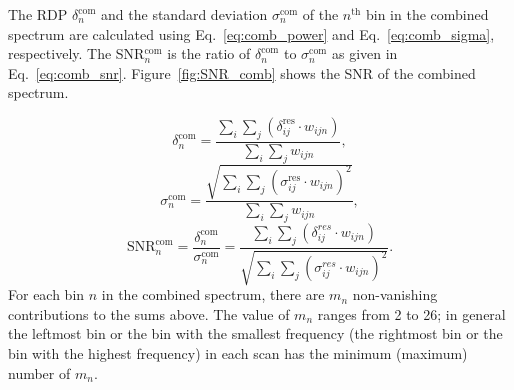 The RDP $\delta^\text{com}_{n}$ and the standard deviation 
$\sigma^\text{com}_{n}$ of the $n^\text{th}$ bin in the combined spectrum are 
calculated using Eq.~\eqref{eq:comb_power} and Eq.~\eqref{eq:comb_sigma}, 
respectively. The SNR$^\text{com}_{n}$ is the ratio of 
$\delta^\text{com}_{n}$ to 
$\sigma^\text{com}_{n}$ as given in Eq.~\eqref{eq:comb_snr}. 
Figure~\ref{fig:SNR_comb} shows the SNR of the combined spectrum. 

\begin{equation}
    \label{eq:comb_power}
    \delta_{n}^\text{com} = \frac{ \sum\limits_{i}\sum\limits_{j}\left(\delta_{ij}^\text{res} \cdot {w_{ijn}}\right)}{\sum\limits_{i}\sum\limits_{j} {w_{ijn}}},
\end{equation}
\begin{equation}
    \label{eq:comb_sigma}
    \sigma_{n}^\text{com} = \frac{ \sqrt{\sum\limits_{i}\sum\limits_{j}(\sigma_{ij}^\text{res} \cdot {w_{ijn}})^2}}{\sum\limits_{i}\sum\limits_{j} {w_{ijn}}},
\end{equation}
\begin{equation}
    \label{eq:comb_snr}
    \text{SNR}_{n}^\text{com} = \frac{\delta^\text{com}_{n}}{\sigma^\text{com}_{n}}= \frac{\sum\limits_{i}\sum\limits_{j}\left(\delta_{ij}^{res} \cdot {w_{ijn}}\right)}{ \sqrt{\sum\limits_{i}\sum\limits_{j}(\sigma_{ij}^{res} \cdot {w_{ijn}})^2}}.
\end{equation} 
For each bin $n$ in the combined spectrum, there are $m_n$ non-vanishing 
contributions to the sums above. The value of $m_n$ ranges from 2 to 26; 
in general the leftmost bin or the bin with the smallest frequency 
(the rightmost bin or the bin with the highest frequency) in each scan has 
the minimum (maximum) number of $m_n$. 



